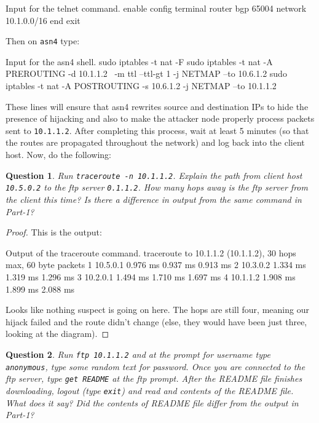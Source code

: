 \documentclass[a4paper,11pt,hidelinks]{article}
\newtheorem{theorem}{Question}[subsection]
\begin{document}
\begin{code}{Input for the telnet command.}
enable   
config terminal
router bgp 65004
network 10.1.0.0/16
end
exit
\end{code}

Then on \verb=asn4= type:

\begin{code}{Input for the asn4 shell.}
sudo iptables -t nat -F
sudo iptables -t nat -A PREROUTING -d 10.1.1.2 \
        -m ttl --ttl-gt 1 -j NETMAP --to 10.6.1.2
sudo iptables -t nat -A POSTROUTING -s 10.6.1.2 -j NETMAP --to 10.1.1.2
\end{code}

These lines will ensure that asn4 rewrites source and destination IPs to hide the presence of hijacking and also to make the attacker node properly process packets sent to \verb=10.1.1.2=.
After completing this process, wait at least 5 minutes (so that the routes are propagated throughout the network) and log back into the client host. Now, do the following:

\begin{theorem}
    Run \verb=traceroute -n 10.1.1.2=. Explain the path from client host \verb=10.5.0.2= to the ftp server \verb=0.1.1.2=. How many hops away is the ftp server from the client this time? Is there a difference in output from the same command in Part-1?
\end{theorem}

\begin{proof}
    This is the output:

\begin{code}{Output of the traceroute command.}
traceroute to 10.1.1.2 (10.1.1.2), 30 hops max, 60 byte packets
1  10.5.0.1  0.976 ms  0.937 ms  0.913 ms
2  10.3.0.2  1.334 ms  1.319 ms  1.296 ms
3  10.2.0.1  1.494 ms  1.710 ms  1.697 ms
4  10.1.1.2  1.908 ms  1.899 ms  2.088 ms
\end{code}

    Looks like nothing suspect is going on here. The hops are still four, meaning our hijack failed and the route didn't change (else, they would have been just three, looking at the diagram).
\end{proof}

\begin{theorem}
    Run \verb=ftp 10.1.1.2= and at the prompt for username type \verb=anonymous=, type some random text for password. Once you are connected to the ftp server, type \verb=get README= at the ftp prompt. After the README file finishes downloading, logout (type \verb=exit=) and read and contents of the README file. What does it say? Did the contents of README file differ from the output in Part-1?
\end{theorem}
\end{document}

